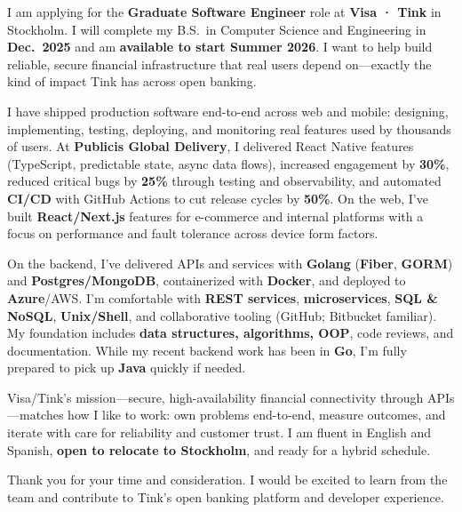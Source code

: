 \documentclass[11pt, a4paper]{awesome-cv}
\begin{document}
\makecvheader[R]
\makelettertitle

\begin{cvletter}

I am applying for the \textbf{Graduate Software Engineer} role at \textbf{Visa · Tink} in Stockholm. I will complete my B.S.\ in Computer Science and Engineering in \textbf{Dec.\ 2025} and am \textbf{available to start Summer 2026}. I want to help build reliable, secure financial infrastructure that real users depend on—exactly the kind of impact Tink has across open banking.

I have shipped production software end-to-end across web and mobile: designing, implementing, testing, deploying, and monitoring real features used by thousands of users. At \textbf{Publicis Global Delivery}, I delivered React Native features (TypeScript, predictable state, async data flows), increased engagement by \textbf{30\%}, reduced critical bugs by \textbf{25\%} through testing and observability, and automated \textbf{CI/CD} with GitHub Actions to cut release cycles by \textbf{50\%}. On the web, I’ve built \textbf{React/Next.js} features for e-commerce and internal platforms with a focus on performance and fault tolerance across device form factors.

On the backend, I’ve delivered APIs and services with \textbf{Golang} (\textbf{Fiber}, \textbf{GORM}) and \textbf{Postgres/MongoDB}, containerized with \textbf{Docker}, and deployed to \textbf{Azure}/AWS. I’m comfortable with \textbf{REST services}, \textbf{microservices}, \textbf{SQL \& NoSQL}, \textbf{Unix/Shell}, and collaborative tooling (GitHub; Bitbucket familiar). My foundation includes \textbf{data structures, algorithms, OOP}, code reviews, and documentation. While my recent backend work has been in \textbf{Go}, I’m fully prepared to pick up \textbf{Java} quickly if needed.

Visa/Tink’s mission—secure, high-availability financial connectivity through APIs—matches how I like to work: own problems end-to-end, measure outcomes, and iterate with care for reliability and customer trust. I am fluent in English and Spanish, \textbf{open to relocate to Stockholm}, and ready for a hybrid schedule.

Thank you for your time and consideration. I would be excited to learn from the team and contribute to Tink’s open banking platform and developer experience.

\end{cvletter}

\makeletterclosing
\end{document}
